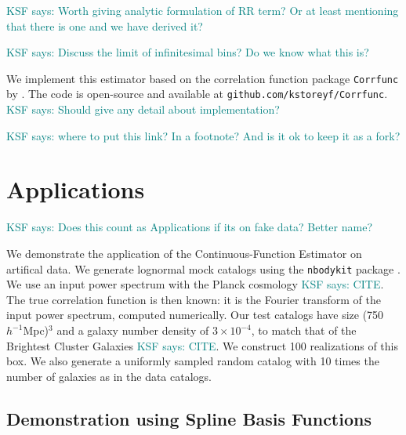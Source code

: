\documentclass[modern]{aastex62}
\newcommand{\est}{the Continuous-Function Estimator\xspace}
\newcommand{\hmpc}{$h^{-1}$Mpc}
\newcommand{\KSF}[1]{\textcolor{teal}{KSF says: #1}}
\begin{document}
\KSF{Worth giving analytic formulation of RR term? Or at least mentioning that there is one and we have derived it?}

\KSF{Discuss the limit of infinitesimal bins? Do we know what this is?}

We implement this estimator based on the correlation function package \texttt{Corrfunc} by \cite{Sinha2019}.
The code is open-source and available at \texttt{github.com/kstoreyf/Corrfunc}.
\KSF{Should give any detail about implementation?}

\KSF{where to put this link? In a footnote? And is it ok to keep it as a fork?}

\section{Applications}
\label{sec:app}

\KSF{Does this count as Applications if its on fake data? Better name?}

We demonstrate the application of \est on artifical data.
We generate lognormal mock catalogs \citep{ColesJones1991} using the \texttt{nbodykit} package \citep{Hand2018}.
We use an input power spectrum with the Planck cosmology \KSF{CITE}.
The true correlation function is then known: it is the Fourier transform of the input power spectrum, computed numerically.
Our test catalogs have size (750 \hmpc)$^3$ and a galaxy number density of $3 \times 10^{-4}$, to match that of the Brightest Cluster Galaxies \KSF{CITE}.
We construct 100 realizations of this box. 
We also generate a uniformly sampled random catalog with 10 times the number of galaxies as in the data catalogs.

\subsection{Demonstration using Spline Basis Functions}
\label{sec:spline}
\end{document}
